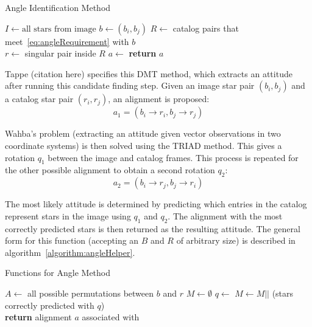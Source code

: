 \begin{algorithm}
    \caption{Angle Identification Method} \label{algorithm:angleIdentification}
    \begin{algorithmic}[1]
        \State $I \gets \text{all stars} \text{ from image}$
        \State $b \gets (b_i, b_j)$
        \State $R \gets $ catalog pairs that meet~\eqref{eq:angleRequirement} with $b$
        \\
        \State $r \gets $ singular pair inside $R$
        \State $a \gets $ 
        \State \textbf{return} $a$
        \EndIf
        \EndFor
        \EndFor
        \EndProcedure
    \end{algorithmic}
\end{algorithm}

Tappe (citation here) specifies this DMT method, which extracts an attitude after running this candidate finding step.
Given an image star pair $(b_i, b_j)$ and a catalog star pair $(r_i, r_j)$, an alignment is proposed:
\begin{equation}
    a_1 = (b_i \rightarrow r_i, b_j \rightarrow r_j)
\end{equation}

Wahba's problem (extracting an attitude given vector observations in two coordinate systems) is then solved using the
TRIAD method. This gives a rotation $q_1$ between the image and catalog frames. This process is repeated for the other
possible alignment to obtain a second rotation $q_2$:
\begin{equation}
    a_2 = (b_i \rightarrow r_j, b_j \rightarrow r_i)
\end{equation}

The most likely attitude is determined by predicting which entries in the catalog represent stars in the image using
$q_1$ and $q_2$. The alignment with the most correctly predicted stars is then returned as the resulting attitude.
The general form for this function (accepting an $B$ and $R$ of arbitrary size) is described
in algorithm~\autoref{algorithm:angleHelper}.

\begin{algorithm}
    \caption{Functions for Angle Method} \label{algorithm:angleHelper}
    \begin{algorithmic}[1]
        \State $A \gets $ all possible permutations between $b$ and $r$
        \State $M \gets \emptyset$
        \State $q \gets $ 
        \State $M \gets M ||$ (stars correctly predicted with $q$)
        \EndFor
        \\
        \State \textbf{return} alignment $a$ associated with 
        \EndFunction
    \end{algorithmic}
\end{algorithm}


